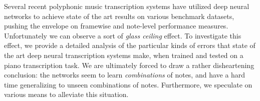 Several recent polyphonic music transcription systems have utilized deep neural networks to achieve state of the art results on various benchmark datasets, pushing the envelope on framewise and note-level performance measures. Unfortunately we can observe a sort of \textit{glass ceiling} effect. To investigate this effect, we provide a detailed analysis of the particular kinds of errors that state of the art deep neural transcription systems make, when trained and tested on a piano transcription task. We are ultimately forced to draw a rather disheartening conclusion: the networks seem to learn \textit{combinations} of notes, and have a hard time generalizing to unseen combinations of notes. Furthermore, we speculate on various means to alleviate this situation.
